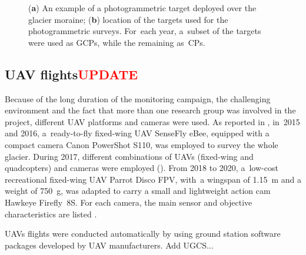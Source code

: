 \begin{figure}
    \centering
    \caption{(\textbf{a}) An example of a photogrammetric target deployed over the
        glacier moraine; (\textbf{b}) location of the targets used for the
        photogrammetric
        surveys. For~each year, a~subset of the targets were used as GCPs, while the
        remaining
        as~CPs.}
    \label{fig:3:belvedereGCP}
\end{figure}


\subsection{UAV flights\textcolor{red}{UPDATE}}\label{sec:3:uav-flights}

Because of the long duration of the monitoring campaign, the challenging environment and
the fact that more than one research group was involved in the project, different UAV
platforms and cameras were used.
As reported in , in~2015 and 2016, a~ready-to-fly fixed-wing UAV
SenseFly eBee, equipped with a compact camera Canon PowerShot S110, was employed to
survey the whole glacier.
During 2017, different combinations of UAVs (fixed-wing and quadcopters) and cameras were
employed ().
From 2018 to 2020, a~low-cost recreational fixed-wing UAV Parrot Disco FPV, with~a
wingspan of \SI{1.15}{\meter} and a weight of \SI{750}{\gram}, was adapted to carry a
small and lightweight action cam Hawkeye Firefly~8S.
For each camera, the main sensor and objective characteristics are listed
.

UAVs flights were conducted automatically by using ground station software packages
developed by UAV manufacturers.
    {\color{red} Add UGCS...}

